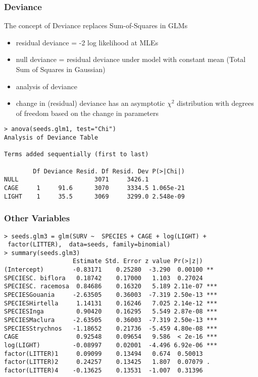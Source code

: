 \documentclass[]{beamer}
\begin{document}
\begin{frame}[fragile]\frametitle{Deviance}
The concept of Deviance replaces Sum-of-Squares in GLMs \pause
\begin{itemize}
\item residual deviance = -2 log likelihood at MLEs \pause
\item null deviance = residual deviance under model with constant mean (Total
  Sum of Squares in Gaussian) \pause
\item analysis of deviance \pause
\item change in (residual) deviance has an asymptotic $\chi^2$
  distribution with degrees of freedom based on the change in
  parameters  \pause
\end{itemize}
\begin{verbatim}
> anova(seeds.glm1, test="Chi")
Analysis of Deviance Table

Terms added sequentially (first to last)

        Df Deviance Resid. Df Resid. Dev P(>|Chi|)
NULL                     3071     3426.1          
CAGE     1     91.6      3070     3334.5 1.065e-21
LIGHT    1     35.5      3069     3299.0 2.548e-09
\end{verbatim}
\end{frame}
\begin{frame}[fragile]\frametitle{Other Variables}
\begin{verbatim}
> seeds.glm3 = glm(SURV ~  SPECIES + CAGE + log(LIGHT) +
 factor(LITTER),  data=seeds, family=binomial)
> summary(seeds.glm3)
                   Estimate Std. Error z value Pr(>|z|)    
(Intercept)        -0.83171    0.25280  -3.290  0.00100 ** 
SPECIESC. biflora   0.18742    0.17000   1.103  0.27024    
SPECIESC. racemosa  0.84686    0.16320   5.189 2.11e-07 ***
SPECIESGouania     -2.63505    0.36003  -7.319 2.50e-13 ***
SPECIESHirtella     1.14131    0.16246   7.025 2.14e-12 ***
SPECIESInga         0.90420    0.16295   5.549 2.87e-08 ***
SPECIESMaclura     -2.63505    0.36003  -7.319 2.50e-13 ***
SPECIESStrychnos   -1.18652    0.21736  -5.459 4.80e-08 ***
CAGE                0.92548    0.09654   9.586  < 2e-16 ***
log(LIGHT)         -0.08997    0.02001  -4.496 6.92e-06 ***
factor(LITTER)1     0.09099    0.13494   0.674  0.50013    
factor(LITTER)2     0.24257    0.13425   1.807  0.07079 .  
factor(LITTER)4    -0.13625    0.13531  -1.007  0.31396    
\end{verbatim}
  
\end{frame}
\end{document}
